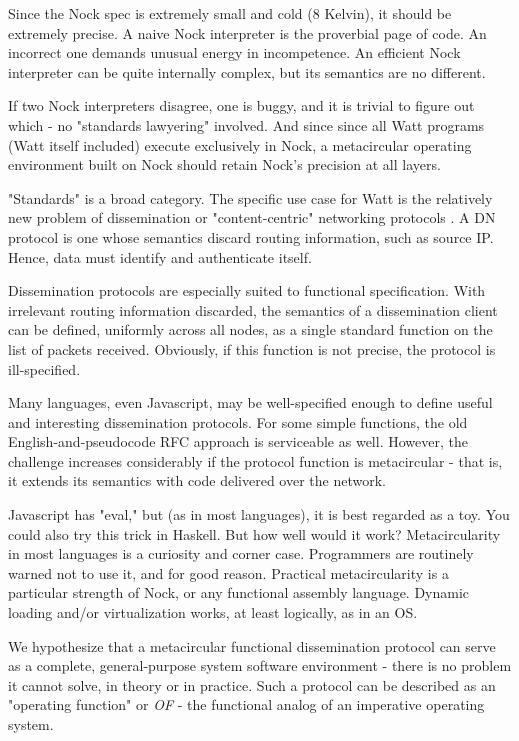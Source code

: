 \documentclass[10pt, nocopyrightspace]{sigplanconf}
\begin{document}
Since the Nock spec is extremely small and cold (8 Kelvin), it
should be extremely precise.  A naive Nock interpreter is the
proverbial page of code.  An incorrect one demands unusual energy
in incompetence.  An efficient Nock interpreter can be quite
internally complex, but its semantics are no different.  

If two Nock interpreters disagree, one is buggy, and it is
trivial to figure out which - no "standards lawyering" involved.
And since since all Watt programs (Watt itself included) execute
exclusively in Nock, a metacircular operating environment built
on Nock should retain Nock's precision at all layers.

"Standards" is a broad category.  The specific use case for Watt
is the relatively new problem of dissemination or
"content-centric" networking protocols \citep{namedcontent}.  
A DN protocol is one
whose semantics discard routing information, such as source IP.
Hence, data must identify and authenticate itself.

Dissemination protocols are especially suited to functional
specification.  With irrelevant routing information discarded,
the semantics of a dissemination client can be defined, uniformly
across all nodes, as a single standard function on the list of
packets received.  Obviously, if this function is not precise,
the protocol is ill-specified.

Many languages, even Javascript, may be well-specified enough to
define useful and interesting dissemination protocols.  For some
simple functions, the old English-and-pseudocode RFC approach is
serviceable as well.  However, the  challenge increases
considerably if the protocol function is metacircular - that is,
it extends its semantics with code delivered over the network.

Javascript has "eval," but (as in most languages), it is best
regarded as a toy.  You could also try this trick in Haskell.
But how well would it work?  Metacircularity in most languages is
a curiosity and corner case.  Programmers are routinely warned
not to use it, and for good reason.  Practical 
metacircularity is a particular strength of Nock, or any
functional assembly language.  Dynamic loading and/or
virtualization works, at least logically, as in an OS. 

We hypothesize that a metacircular functional dissemination
protocol can serve as a complete, general-purpose system software
environment - there is no problem it cannot solve, in theory or
in practice.  Such a
protocol can be described as an "operating function" or \emph{OF} -
the functional analog of an imperative operating system.  
\end{document}
